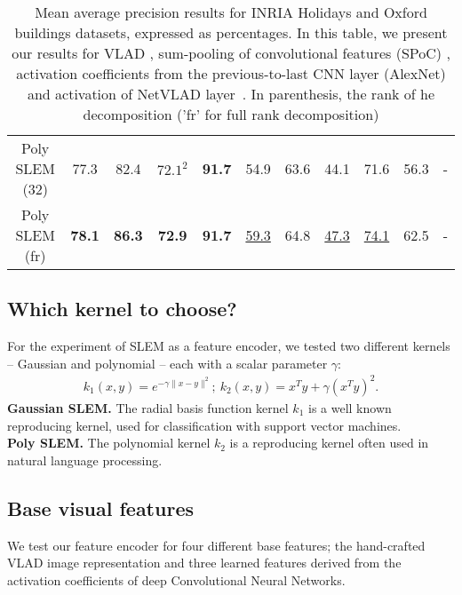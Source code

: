 \begin{table*}[t!]
\begin{center}
\begin{tabular}{c@{\hskip 1em}cccc@{\hskip 1em}cccc@{\hskip 1em}cc}
Poly SLEM (32)      & 77.3 & 82.4 & $72.1^2$ & \bf{91.7} & 54.9 & 63.6 & 44.1 & 71.6 & 56.3 & - \\
Poly SLEM   (fr)    & \bf{78.1} & \bf{86.3}  & \bf{72.9} & \bf{91.7} & \ul{59.3}  & 64.8 & \ul{47.3} & \ul{74.1} & 62.5 & - \\
\hline
\end{tabular}
\caption{Mean average precision results for INRIA Holidays and Oxford buildings datasets, expressed as percentages. In this table, we present our results for VLAD \cite{Delhumeau2013}, sum-pooling of convolutional features (SPoC) \cite{babenko15}, activation coefficients from the previous-to-last CNN layer (AlexNet) \cite{Krizhevsky2012} and activation of NetVLAD layer~\cite{Arandjelovic15}. In parenthesis, the rank of he decomposition ('fr' for full rank decomposition)}
\end{center}
\label{fullrank}
\end{table*}

\subsection{Which kernel to choose?}
For the experiment of SLEM as a feature encoder, we tested two different kernels -- Gaussian and polynomial -- each with a scalar parameter $\gamma$:
\begin{align}
    k_1(x,y) = e^{-\gamma\|x-y \|^2}; \ 
    k_2(x,y) = x^Ty+\gamma(x^Ty)^2. \label{kernels}
\end{align}
\textbf{Gaussian SLEM.} The radial basis function kernel $k_1$ is a
well known reproducing kernel, used for classification with support vector machines.\\
\textbf{Poly SLEM.} The polynomial kernel $k_2$ is a reproducing kernel often used in natural language processing.\\


\subsection{Base visual features}
We test our feature encoder for four different base features; the hand-crafted VLAD image representation and three learned features derived from the activation coefficients of deep Convolutional Neural Networks.


